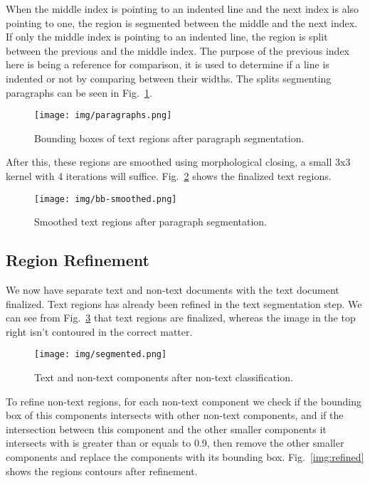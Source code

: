 \documentclass[conference]{IEEEtran}
\begin{document}
    When the middle index is pointing to an indented line and the next index is also pointing to one,
    the region is segmented between the middle and the next index.
    If only the middle index is pointing to an indented line, the region is split between the previous
    and the middle index.
    The purpose of the previous index here is being a reference for comparison, it is used to determine
    if a line is indented or not by comparing between their widths.
    The splits segmenting paragraphs can be seen in Fig.~\ref{img:paragraphs}.

    \begin{figure}[htbp]
        \centerline{\texttt{[image: img/paragraphs.png]}}
        \caption{Bounding boxes of text regions after paragraph segmentation.}
        \label{img:paragraphs}
    \end{figure}

    After this, these regions are smoothed using morphological closing, a small
    3x3 kernel with 4 iterations will suffice.
    Fig.~\ref{img:paragraphs-smoothed} shows the finalized text regions.

    \begin{figure}[htbp]
        \centerline{\texttt{[image: img/bb-smoothed.png]}}
        \caption{Smoothed text regions after paragraph segmentation.}
        \label{img:paragraphs-smoothed}
    \end{figure}

    \subsection{Region Refinement}

    We now have separate text and non-text documents with the text document finalized.
    Text regions has already been refined in the text segmentation step.
    We can see from Fig.~\ref{img:segmented} that text regions are finalized,
    whereas the image in the top right isn't contoured in the correct matter.

    \begin{figure}[htbp]
        \centerline{\texttt{[image: img/segmented.png]}}
        \caption{Text and non-text components after non-text classification.}
        \label{img:segmented}
    \end{figure}

    To refine non-text regions, for each non-text component we check if the bounding
    box of this components intersects with other non-text components, and if the
    intersection between this component and the other smaller components it intersects
    with is greater than or equals to 0.9, then remove the other smaller components and
    replace the components with its bounding box. Fig.~\ref{img:refined} shows the
    regions contours after refinement.
\end{document}
